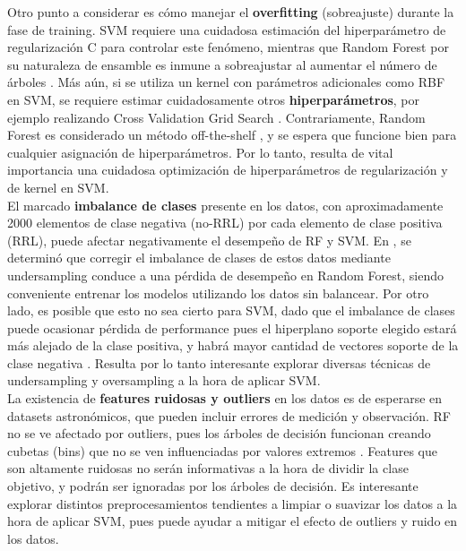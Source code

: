 Otro punto a considerar es cómo manejar el \textbf{overfitting} (sobreajuste) durante la fase de training. SVM requiere una cuidadosa estimación del hiperparámetro de regularización C para controlar este fenómeno, mientras que Random Forest por su naturaleza de ensamble es inmune a sobreajustar al aumentar el número de árboles \cite{rf}. Más aún, si se utiliza un kernel con parámetros adicionales como RBF en SVM, se requiere estimar cuidadosamente otros \textbf{hiperparámetros}, por ejemplo realizando Cross Validation Grid Search \cite{svm_practical}. Contrariamente, Random Forest es considerado un método off-the-shelf \cite{offshelf}, y se espera que funcione bien para cualquier asignación de hiperparámetros. Por lo tanto, resulta de vital importancia una cuidadosa optimización de hiperparámetros de regularización y de kernel en SVM. \\

El marcado \textbf{imbalance de clases} presente en los datos, con aproximadamente 2000 elementos de clase negativa (no-RRL) por cada elemento de clase positiva (RRL), puede afectar negativamente el desempeño de RF y SVM. En \cite{jbc}, se determinó que corregir el imbalance de clases de estos datos mediante undersampling conduce a una pérdida de desempeño en Random Forest, siendo conveniente entrenar los modelos utilizando los datos sin balancear. Por otro lado, es posible que esto no sea cierto para SVM, dado que el imbalance de clases puede ocasionar pérdida de performance pues el hiperplano soporte elegido estará más alejado de la clase positiva, y habrá mayor cantidad de vectores soporte de la clase negativa \cite{imbalanced_svm}. Resulta por lo tanto interesante explorar diversas técnicas de undersampling y oversampling a la hora de aplicar SVM. \\

La existencia de \textbf{features ruidosas y outliers} en los datos es de esperarse en datasets astronómicos, que pueden incluir errores de medición y observación. RF no se ve afectado por outliers, pues los árboles de decisión funcionan creando cubetas (bins) que no se ven influenciadas por valores extremos \cite{statisticallearning}. Features que son altamente ruidosas no serán informativas a la hora de dividir la clase objetivo, y podrán ser ignoradas por los árboles de decisión. Es interesante explorar distintos preprocesamientos tendientes a limpiar o suavizar los datos a la hora de aplicar SVM, pues puede ayudar a mitigar el efecto de outliers y ruido en los datos. \\

